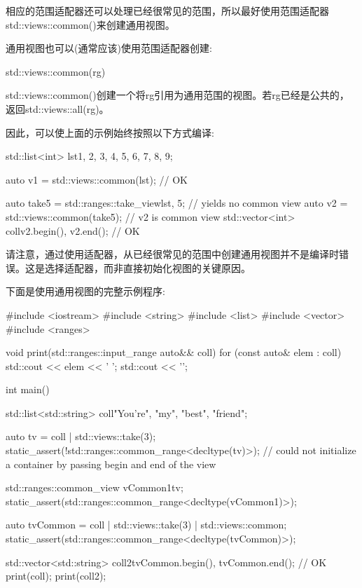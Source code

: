 相应的范围适配器还可以处理已经很常见的范围，所以最好使用范围适配器std::views::common()来创建通用视图。


通用视图也可以(通常应该)使用范围适配器创建:

\begin{cpp}
std::views::common(rg)
\end{cpp}

std::views::common()创建一个将rg引用为通用范围的视图。若rg已经是公共的，返回std::views::all(rg)。

因此，可以使上面的示例始终按照以下方式编译:

\begin{cpp}
std::list<int> lst{1, 2, 3, 4, 5, 6, 7, 8, 9};

auto v1 = std::views::common(lst); // OK

auto take5 = std::ranges::take_view{lst, 5}; // yields no common view
auto v2 = std::views::common(take5); // v2 is common view
std::vector<int> coll{v2.begin(), v2.end()}; // OK
\end{cpp}

请注意，通过使用适配器，从已经很常见的范围中创建通用视图并不是编译时错误。这是选择适配器，而非直接初始化视图的关键原因。

下面是使用通用视图的完整示例程序:


\begin{cpp}
#include <iostream>
#include <string>
#include <list>
#include <vector>
#include <ranges>

void print(std::ranges::input_range auto&& coll)
{
	for (const auto& elem : coll) {
		std::cout << elem << ' ';
	}
	std::cout << '\n';
}

int main()
{
	std::list<std::string> coll{"You're", "my", "best", "friend"};
	
	auto tv = coll | std::views::take(3);
	static_assert(!std::ranges::common_range<decltype(tv)>);
	// could not initialize a container by passing begin and end of the view
	
	std::ranges::common_view vCommon1{tv};
	static_assert(std::ranges::common_range<decltype(vCommon1)>);
	
	auto tvCommon = coll | std::views::take(3) | std::views::common;
	static_assert(std::ranges::common_range<decltype(tvCommon)>);
	
	std::vector<std::string> coll2{tvCommon.begin(), tvCommon.end()}; // OK
	print(coll);
	print(coll2);
}
\end{cpp}

